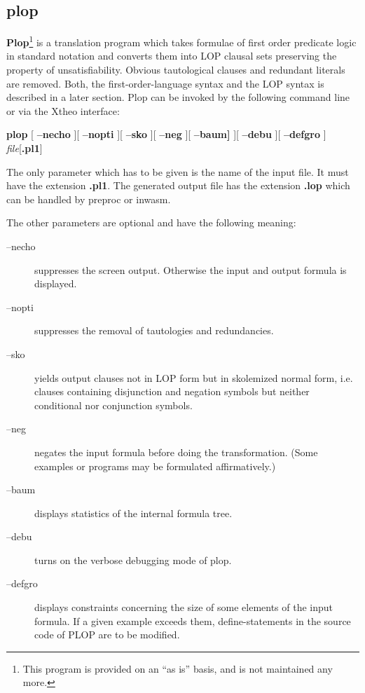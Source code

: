 %

\subsection{plop}
\label{sec:plop}

{\bf Plop}\footnote{This program is provided on an ``as is'' basis, and is
not maintained any more.} is a translation program which
takes formulae of first order predicate logic in standard notation
and converts them into LOP clausal sets preserving the property
of unsatisfiability. Obvious tautological clauses and redundant
literals are removed. 
Both, the first-order-language syntax and the LOP syntax is described in
a later section. Plop can be invoked by the following command line or via
the Xtheo interface:
\begin{center}
{\bf plop} [ {\bf --necho} ][ {\bf --nopti} ][
{\bf --sko} ][ {\bf --neg} ][ {\bf --baum]} ][
{\bf --debu} ][ {\bf --defgro} ] {\it file\/}[{\bf .pl1}]
\end{center}
The only parameter which has to be given is the name of the input file.
It must have the extension {\bf .pl1}. The generated output file
has the extension {\bf .lop} which can be handled by preproc or inwasm.

The other parameters are optional and have the following meaning:
\begin{description}
\item[--necho]
suppresses the screen output. 
Otherwise the input and output formula is displayed.
\item[--nopti]
suppresses the removal of tautologies and redundancies. 
\item[--sko]
yields output clauses not in LOP form but in skolemized
normal form, i.e. clauses containing disjunction
and negation symbols but neither conditional nor conjunction
symbols.
\item[--neg]
negates the input formula before doing the transformation.
(Some examples or programs may be formulated affirmatively.)
\item[--baum]
displays statistics of the internal formula tree.
\item[--debu]
turns on the verbose debugging mode of plop.
\item[--defgro]
displays constraints concerning the size of some elements
of the input formula. If a given example exceeds them, define-statements
in the source code of PLOP are to be modified.
\end{description}

